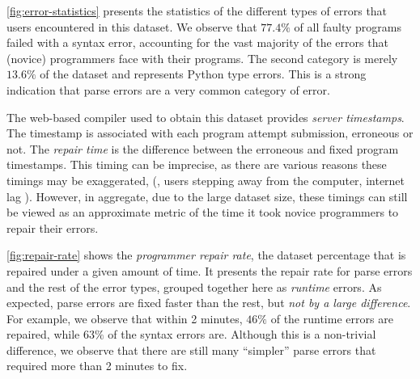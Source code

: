 %
\autoref{fig:error-statistics} presents the statistics
of the different types of errors that users encountered
in this dataset.
%
We observe that $77.4 \% $ of all faulty programs failed
with a syntax error, accounting for the vast majority of
the errors that (novice) programmers face with their
programs.
%
The second category is merely $13.6\%$ of the dataset and
represents Python type errors. This is a strong indication
that parse errors are a very common category of error.

%
The web-based compiler used to obtain this
dataset provides \emph{server timestamps}.
%
The timestamp is associated with each program attempt
submission, erroneous or not. The \emph{repair time}
is the difference between the erroneous and
fixed program timestamps.
%
This timing can be imprecise,
as there are various reasons these timings may be exaggerated,
(\eg, users stepping away from the computer, internet lag \etc).
%
However, in aggregate, due to the large
dataset size, these timings
can still be viewed as an approximate metric
of the time it took novice programmers to
repair their errors.

\autoref{fig:repair-rate} shows the \emph{programmer repair rate},
\ie the dataset percentage that is repaired under a given amount of time.
%
It presents the repair rate for parse errors and the rest
of the error types, grouped together here as \emph{runtime} errors.
%
As expected, parse errors are fixed faster than the rest,
but \emph{not by a large difference}.
%
For example, we observe that within 2 minutes,
$46\%$ of the runtime errors are repaired, while
$63\%$ of the syntax errors are.
%
Although this is a non-trivial difference,
we observe that there are still many
``simpler'' parse errors that required
more than 2 minutes to fix.

